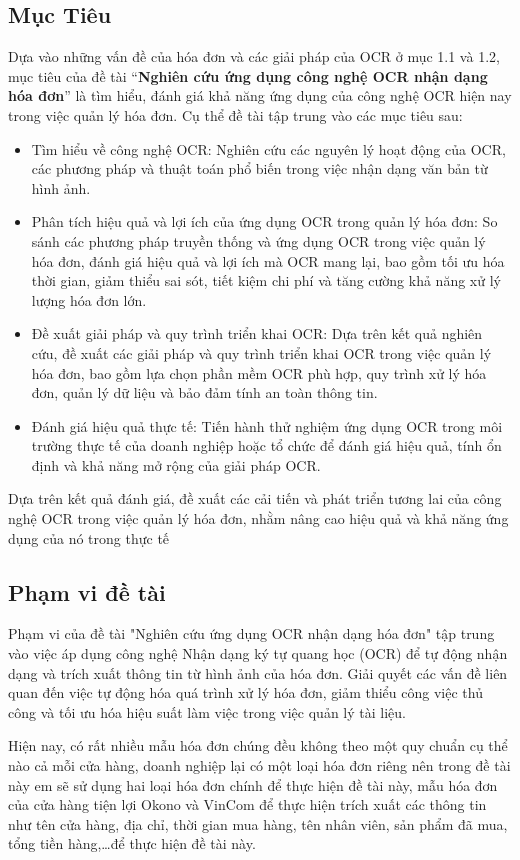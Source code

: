 \subsection{Mục Tiêu}
Dựa vào những vấn đề của hóa đơn và các giải pháp của OCR ở mục 1.1 và 1.2, mục tiêu của đề tài “\textbf{Nghiên cứu ứng dụng công nghệ OCR nhận dạng hóa đơn}” là tìm hiểu, đánh giá khả năng ứng dụng của công nghệ OCR hiện nay trong việc quản lý hóa đơn. Cụ thể đề tài tập trung vào các mục tiêu sau:
\begin{itemize}
    \item Tìm hiểu về công nghệ OCR: Nghiên cứu các nguyên lý hoạt động của OCR, các phương pháp và thuật toán phổ biến trong việc nhận dạng văn bản từ hình ảnh.
    \item Phân tích hiệu quả và lợi ích của ứng dụng OCR trong quản lý hóa đơn: So sánh các phương pháp truyền thống và ứng dụng OCR trong việc quản lý hóa đơn, đánh giá hiệu quả và lợi ích mà OCR mang lại, bao gồm tối ưu hóa thời gian, giảm thiểu sai sót, tiết kiệm chi phí và tăng cường khả năng xử lý lượng hóa đơn lớn.
    \item Đề xuất giải pháp và quy trình triển khai OCR: Dựa trên kết quả nghiên cứu, đề xuất các giải pháp và quy trình triển khai OCR trong việc quản lý hóa đơn, bao gồm lựa chọn phần mềm OCR phù hợp, quy trình xử lý hóa đơn, quản lý dữ liệu và bảo đảm tính an toàn thông tin.
    \item Đánh giá hiệu quả thực tế: Tiến hành thử nghiệm ứng dụng OCR trong môi trường thực tế của doanh nghiệp hoặc tổ chức để đánh giá hiệu quả, tính ổn định và khả năng mở rộng của giải pháp OCR.
\end{itemize}
Dựa trên kết quả đánh giá, đề xuất các cải tiến và phát triển tương lai của công nghệ OCR trong việc quản lý hóa đơn, nhằm nâng cao hiệu quả và khả năng ứng dụng của nó trong thực tế

\subsection{Phạm vi đề tài}
Phạm vi của đề tài "Nghiên cứu ứng dụng OCR nhận dạng hóa đơn" tập trung vào việc áp dụng công nghệ Nhận dạng ký tự quang học (OCR) để tự động nhận dạng và trích xuất thông tin từ hình ảnh của hóa đơn. Giải quyết các vấn đề liên quan đến việc tự động hóa quá trình xử lý hóa đơn, giảm thiểu công việc thủ công và tối ưu hóa hiệu suất làm việc trong việc quản lý tài liệu.

Hiện nay, có rất nhiều mẫu hóa đơn chúng đều không theo một quy chuẩn cụ thể nào cả mỗi cửa hàng, doanh nghiệp lại có một loại hóa đơn riêng nên trong đề tài này em sẽ sử dụng hai loại hóa đơn chính để thực hiện đề tài này, mẫu hóa đơn của cửa hàng tiện lợi Okono và VinCom để thực hiện trích xuất các thông tin như tên cửa hàng, địa chỉ, thời gian mua hàng, tên nhân viên, sản phẩm đã mua, tổng tiền hàng,\ldots để thực hiện đề tài này.

